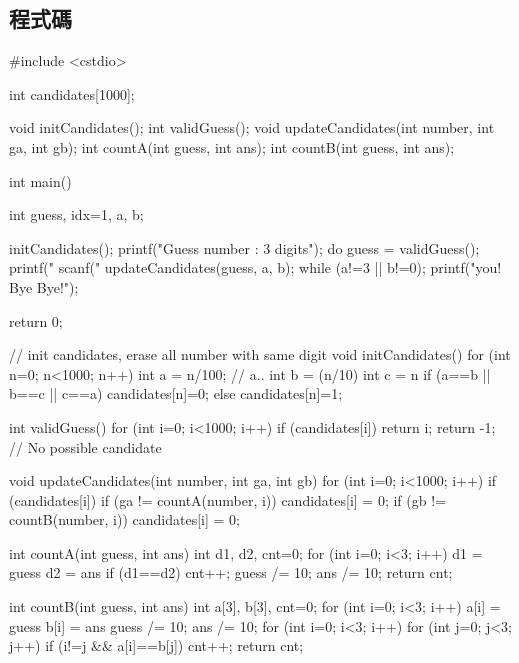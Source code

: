\subsection{程式碼}
\begin{cppcode}
#include <cstdio>

int candidates[1000];

void initCandidates();
int  validGuess();
void updateCandidates(int number, int ga, int gb);
int  countA(int guess, int ans);
int  countB(int guess, int ans);

int main()
{
	int guess, idx=1, a, b;
	
	initCandidates();
	printf("Guess number : 3 digits\n\n");
	do {
		guess = validGuess();
		printf("%
		scanf("%
		updateCandidates(guess, a, b);
	} while (a!=3 || b!=0);
	printf("\nThank you! Bye Bye!\n");
	
	return 0;
}

// init candidates, erase all number with same digit
void initCandidates()
{
	for (int n=0; n<1000; n++) {
		int a = n/100;       // a..
		int b = (n/10) %
		int c = n %
		if (a==b || b==c || c==a) candidates[n]=0;
		else candidates[n]=1;
	}
}

int validGuess()
{
	for (int i=0; i<1000; i++) {
		if (candidates[i]) return i;
	}
	return -1; // No possible candidate
}

void updateCandidates(int number, int ga, int gb)
{
	for (int i=0; i<1000; i++) {
		if (candidates[i]) {
			if (ga != countA(number, i)) candidates[i] = 0;
			if (gb != countB(number, i)) candidates[i] = 0;
		}
	}
}

int countA(int guess, int ans)
{
	int d1, d2, cnt=0;
	for (int i=0; i<3; i++) {
		d1 = guess %
		d2 = ans %
		if (d1==d2) cnt++;
		guess /= 10;
		ans /= 10;
	}
	return cnt;
}

int countB(int guess, int ans)
{
	int a[3], b[3], cnt=0;
	for (int i=0; i<3; i++) {
		a[i] = guess %
		b[i] = ans %
		guess /= 10;
		ans /= 10;
	}
	for (int i=0; i<3; i++) {
		for (int j=0; j<3; j++) {
			if (i!=j && a[i]==b[j]) cnt++;
		}
	}
	return cnt;
}

\end{cppcode}